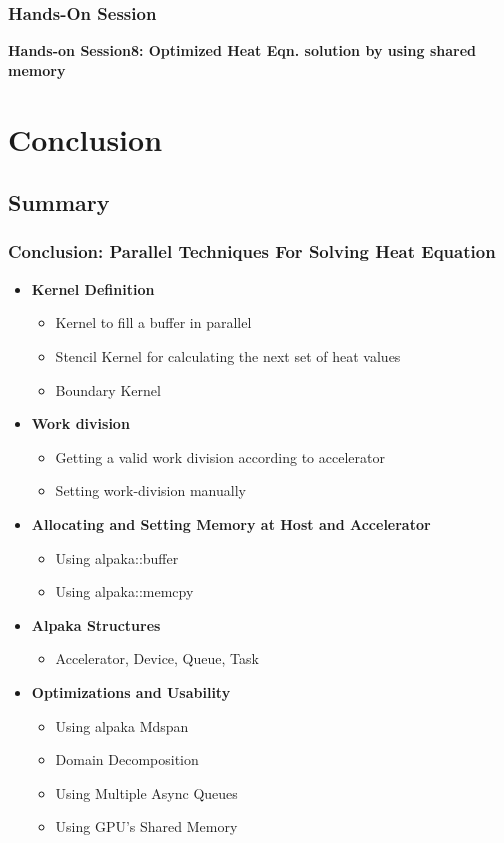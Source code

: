 \documentclass[9pt]{beamer}
\begin{document}
\begin{frame}
\frametitle{Hands-On Session}
\begin{center}
      \Huge \textbf{Hands-on Session8: Optimized Heat Eqn. solution by using shared memory}
  \end{center}
\end{frame}


\section{Conclusion}
\subsection{Summary}
\begin{frame}
\frametitle{Conclusion: Parallel Techniques For Solving Heat Equation}
\begin{itemize}
    \item \textbf{Kernel Definition}
    \begin{itemize}
        \item Kernel to fill a buffer in parallel
        \item Stencil Kernel for calculating the next set of heat values
        \item Boundary Kernel
    \end{itemize}
    \item \textbf{Work division}
    \begin{itemize}
        \item Getting a valid work division according to accelerator
        \item Setting work-division manually
    \end{itemize}
    \item \textbf{Allocating and Setting Memory at Host and Accelerator }
    \begin{itemize}
        \item Using alpaka::buffer
        \item Using alpaka::memcpy
    \end{itemize}
    \item \textbf{Alpaka Structures}
    \begin{itemize}
        \item Accelerator, Device, Queue, Task
    \end{itemize}
    \item \textbf{Optimizations and Usability}
    \begin{itemize}
        \item Using alpaka Mdspan
        \item Domain Decomposition
        \item Using Multiple Async Queues
        \item Using GPU's Shared Memory
    \end{itemize}
\end{itemize}
\end{frame}
\end{document}
